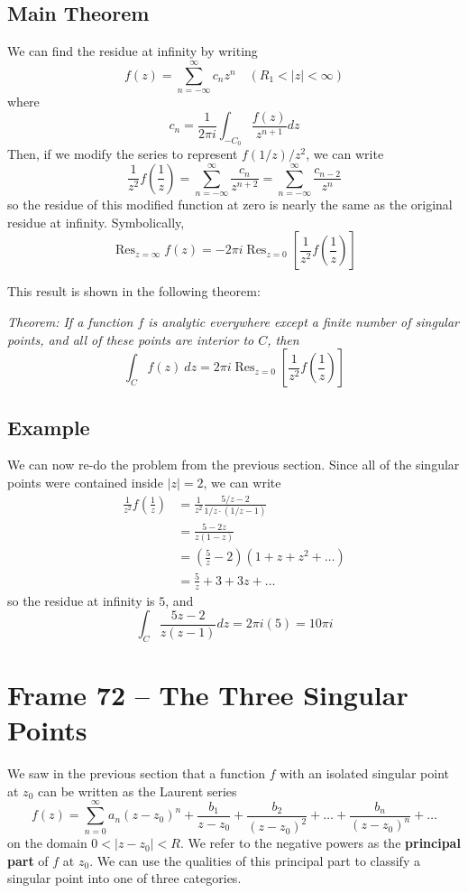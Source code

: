 \documentclass{article}
\renewcommand{\emph}{\textbf}
\DeclareMathOperator{\Res}{Res}
\begin{document}
\subsection{Main Theorem}
We can find the residue at infinity by writing
\[
	f(z) = \sum_{n = -\infty}^\infty c_n z^n	\quad	(R_1 < |z| < \infty)
\]
where
\[
	c_n = \frac{1}{2\pi i} \int_{-C_0} \frac{f(z)}{z^{n+1}} dz
\]
Then, if we modify the series to represent $f(1/z) / z^2$, we can write
\[
	\frac{1}{z^2} f\left(\frac{1}{z} \right)
	= \sum_{n=-\infty}^\infty \frac{c_n}{z^{n+2}}
	= \sum_{n=-\infty}^\infty \frac{c_{n-2}}{z^n}
\]
so the residue of this modified function at zero is nearly the same as the original residue at infinity. Symbolically,
\[
	\Res_{z = \infty} f(z) = -2\pi i \Res_{z = 0} \left[ \frac{1}{z^2} f\left(\frac{1}{z} \right) \right]
\]

This result is shown in the following theorem:

\textit{Theorem: If a function $f$ is analytic everywhere except a finite number of singular points, and all of these points are interior to $C$, then
\[
	\int_C f(z)~dz = 2\pi i \Res_{z = 0} \left[ \frac{1}{z^2} f\left( \frac{1}{z} \right)\right]
\]}

\subsection{Example}
We can now re-do the problem from the previous section. Since all of the singular points were contained inside $|z| = 2$, we can write
\begin{align*}
	\frac{1}{z^2} f\left( \frac{1}{z} \right)
	&= \frac{1}{z^2} \frac{5/z - 2}{1/z \cdot (1/z - 1)} \\
	&= \frac{5 - 2z}{z(1 - z)} \\
	&= \left( \frac{5}{z} - 2 \right) (1 + z + z^2 + \dots) \\
	&= \frac{5}{z} + 3 + 3z + \dots
\end{align*}
so the residue at infinity is $5$, and
\[
	\int_C \frac{5z - 2}{z(z - 1)} dz = 2\pi i(5) = 10\pi i
\]


\clearpage
\section{Frame 72 -- The Three Singular Points}
We saw in the previous section that a function $f$ with an isolated singular point at $z_0$ can be written as the Laurent series
\[
	f(z) = \sum_{n=0}^\infty a_n (z - z_0)^n
	+ \frac{b_1}{z - z_0}
	+ \frac{b_2}{(z - z_0)^2} + \dots
	+ \frac{b_n}{(z - z_0)^n} + \dots
\]
on the domain $0 < |z - z_0| < R$. We refer to the negative powers as the \emph{principal part} of $f$ at $z_0$. We can use the qualities of this principal part to classify a singular point into one of three categories.
\end{document}
